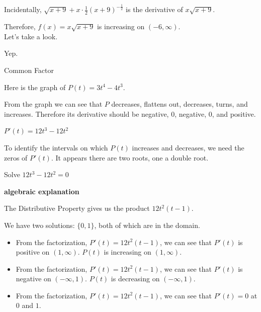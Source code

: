 \documentclass{ximera}
\begin{document}
Incidentally, $\sqrt{x+9} + x \cdot \frac{1}{2} (x+9)^{-\tfrac{1}{2}}$ is the derivative of $x \sqrt{x+9}$. 

Therefore, $f(x) = x \sqrt{x+9}$ is increasing on $(-6, \infty)$. \\

Let's take a look.







\begin{center}
\end{center}


Yep.








\begin{example}  Common Factor


Here is the graph of $P(t) = 3 t^4 - 4 t^3$.



\begin{center}
\end{center}


From the graph we can see that $P$ decreases, flattens out, decreases, turns, and increases.  Therefore its derivative should be negative, $0$, negative, $0$, and positive. 



$P'(t) = 12 t^3 - 12 t^2$ 



\begin{center}
\end{center}



To identify the intervals on which $P(t)$ increases and decreases, we need the zeros of $P'(t)$.  It appears there are two roots, one a double root.






Solve $12 t^3 - 12 t^2 = 0$


\textbf{\textcolor{red!75!green}{algebraic explanation}} 

The Distributive Property gives us the product $12 t^2 (t-1)$.




We have two solutions: $\{ 0, 1  \}$, both of which are in the domain.




\begin{itemize}
\item From the factorization, $P'(t) = 12 t^2 (t-1)$, we can see that $P'(t)$ is positive on $(1, \infty)$. $P(t)$ is increasing on $(1, \infty)$. 
\item From the factorization, $P'(t) = 12 t^2 (t-1)$, we can see that $P'(t)$ is negative on $(-\infty, 1)$. $P(t)$ is decreasing on $(-\infty, 1)$. 
\item From the factorization, $P'(t) = 12 t^2 (t-1)$, we can see that $P'(t) = 0$ at $0$ and $1$. 
\end{itemize}



\end{example}
\end{document}
